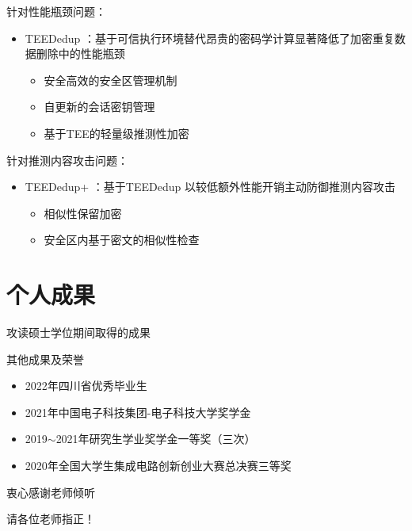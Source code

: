 \documentclass{beamer}
\newcommand{\sysnameS}{TEEDedup }
\newcommand{\prototype}{TEEDedup+ }
\begin{document}
\begin{frame}{}
    \begin{textbox}{针对性能瓶颈问题：}
        \begin{itemize}
            \item \sysnameS ：基于可信执行环境替代昂贵的密码学计算显著降低了加密重复数据删除中的性能瓶颈
                  \begin{itemize}
                      \item 安全高效的安全区管理机制
                      \item 自更新的会话密钥管理
                      \item 基于TEE的轻量级推测性加密
                  \end{itemize}
        \end{itemize}
    \end{textbox}
    \begin{textbox}{针对推测内容攻击问题：}
        \begin{itemize}
            \item \prototype ：基于\sysnameS 以较低额外性能开销主动防御推测内容攻击
                  \begin{itemize}
                      \item 相似性保留加密
                      \item 安全区内基于密文的相似性检查
                  \end{itemize}
        \end{itemize}
    \end{textbox}
\end{frame}

\section{个人成果}

\begin{frame}[allowframebreaks]{攻读硕士学位期间取得的成果}
    \newcommand{\bstlabelmark}{lo}
    \nocite{*}
    
    
    \begin{textbox}{其他成果及荣誉}
        \begin{itemize}
            \item 2022年四川省优秀毕业生
            \item 2021年中国电子科技集团-电子科技大学奖学金
            \item 2019$\sim$2021年研究生学业奖学金一等奖（三次）
            \item 2020年全国大学生集成电路创新创业大赛总决赛三等奖
        \end{itemize}
    \end{textbox}
\end{frame}

\begin{frame}
    \begin{center}
        {\Huge 衷心感谢老师倾听}

        {\Huge 请各位老师指正！}
    \end{center}
\end{frame}
\end{document}
